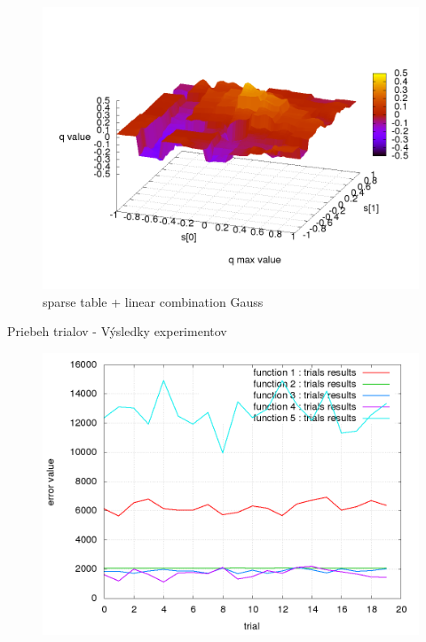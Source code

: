 \begin{figure}[!htb]
\centering
\includegraphics[scale=.2]{../../results_q_learning/map_1/function_type_3/iterations_10/q_learning_result.png}
\caption{sparse table + linear combination Gauss}
\end{figure}




Priebeh trialov - Výsledky experimentov

\begin{figure}[!htb]
\centering
\includegraphics[scale=.36]{../../results_q_learning/map_1/trials_average_results_progress.png}
\end{figure}




